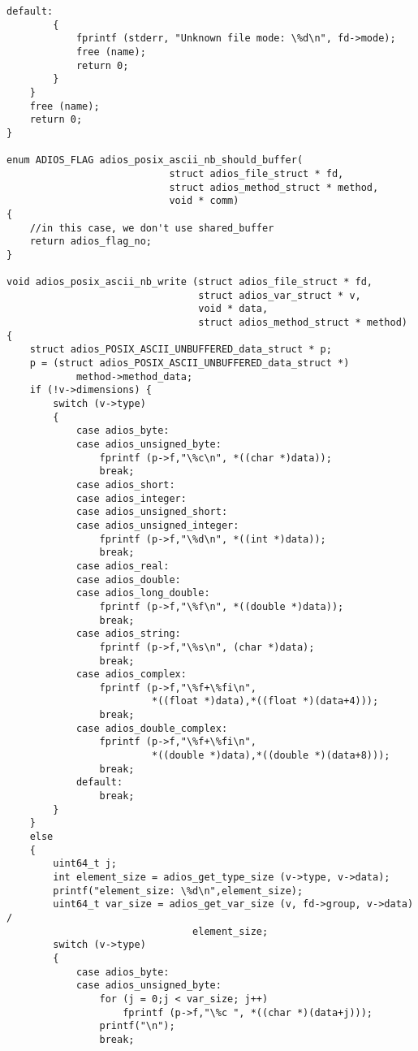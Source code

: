 \begin{lstlisting}[emph={ADIOS_METHOD_POSIX_ASCII_NB}, emphstyle={\color{red}\large\bf},
                   caption={Example: add unbuffered POSIX method, C source of write method}]
        default:
        {
            fprintf (stderr, "Unknown file mode: \%d\n", fd->mode);
            free (name);
            return 0;
        }
    }
    free (name);
    return 0;
}

enum ADIOS_FLAG adios_posix_ascii_nb_should_buffer(
                            struct adios_file_struct * fd,
                            struct adios_method_struct * method,
                            void * comm) 
{
    //in this case, we don't use shared_buffer
    return adios_flag_no;
}

void adios_posix_ascii_nb_write (struct adios_file_struct * fd,
                                 struct adios_var_struct * v,
                                 void * data,
                                 struct adios_method_struct * method) 
{
    struct adios_POSIX_ASCII_UNBUFFERED_data_struct * p;
    p = (struct adios_POSIX_ASCII_UNBUFFERED_data_struct *)
            method->method_data;
    if (!v->dimensions) {
        switch (v->type)
        {
            case adios_byte:
            case adios_unsigned_byte:
                fprintf (p->f,"\%c\n", *((char *)data)); 
                break;
            case adios_short:
            case adios_integer:
            case adios_unsigned_short:
            case adios_unsigned_integer:
                fprintf (p->f,"\%d\n", *((int *)data)); 
                break;
            case adios_real:
            case adios_double:
            case adios_long_double:
                fprintf (p->f,"\%f\n", *((double *)data)); 
                break;
            case adios_string:
                fprintf (p->f,"\%s\n", (char *)data); 
                break;
            case adios_complex:
                fprintf (p->f,"\%f+\%fi\n", 
                         *((float *)data),*((float *)(data+4))); 
                break;
            case adios_double_complex:
                fprintf (p->f,"\%f+\%fi\n", 
                         *((double *)data),*((double *)(data+8))); 
                break;
            default:
                break;
        }
    } 
    else
    {
        uint64_t j;
        int element_size = adios_get_type_size (v->type, v->data);
        printf("element_size: \%d\n",element_size);
        uint64_t var_size = adios_get_var_size (v, fd->group, v->data) /
                                element_size;
        switch (v->type)
        {
            case adios_byte:
            case adios_unsigned_byte:
                for (j = 0;j < var_size; j++)
                    fprintf (p->f,"\%c ", *((char *)(data+j)));
                printf("\n");
                break;

\end{lstlisting}
